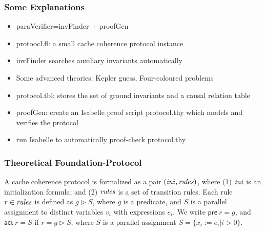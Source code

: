 \documentclass{beamer}
\begin{document}
\begin{frame}\frametitle{Some Explanations}

\begin{itemize}
\item {\sf paraVerifier}={\sf invFinder} + {\sf proofGen}

\item protoocl.fl: a small cache coherence protocol instance


\item {\sf invFinder} searches auxiliary invariants automatically
\item Some advanced theories: Kepler guess, Four-coloured problems

\item   protocol.tbl:  stores the set of ground invariants and a causal relation table

\item {\sf proofGen}: create an Isabelle proof script {\sf protocol.thy} which models and verifies the protocol

\item run Isabelle to automatically proof-check {\sf protocol.thy}
\end{itemize}

\end{frame}

\begin{frame}\frametitle{Theoretical Foundation-Protocol}
\noindent
A cache coherence protocol is formalized as a pair $({\it ini}, {\it rules})$, where
(1) ${\it ini}$ is an initialization formula; and
(2) ${\it rules}$ is a set of transition rules. Each rule $r\in {\it rules}$ is defined as
  $g \vartriangleright  S$, where $g$ is a predicate, and $S$ is a
  parallel assignment to distinct  variables $v_i$ with expressions
  $e_i$. We write $\mathsf{pre}~r=g$, and $\mathsf{act}~r=S$
  if $r=g \vartriangleright S$, where $S$ is  a parallel assignment $S=\{x_i:=e_i | i>0\}$.
\end{frame}
\end{document}
